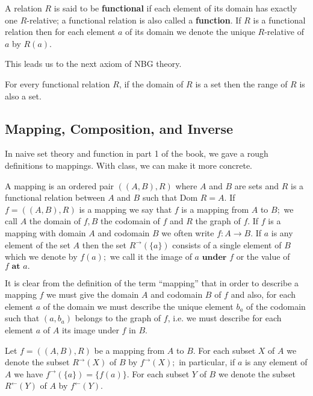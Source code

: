 \begin{definition}
    A relation $R$ is said to be \textbf{functional} if each element of its domain has exactly one $R$-relative; 
    a functional relation is also called a \textbf{function}. If $R$ is a functional relation then for each element 
    $a$ of its domain we denote the unique $R$-relative of $a$ by $R(a).$ 
\end{definition}

    This leads us to the next axiom of NBG theory.
    \begin{axiom}
        For every functional relation $R$, if the domain of $R$ is a set then the range 
        of $R$ is also a set.
    \end{axiom}
\subsection{Mapping, Composition, and Inverse}
    In naive set theory and function in part 1 of the book, we gave a rough 
    definitions to mappings. With class, we can make it more concrete.
    \begin{definition}[mapping]
        A mapping is an ordered pair $((A,B),R)$ where $A$ and $B$ are sets and $R$ is a 
        functional relation between $A$ and $B$ such that Dom $R=A.$ If 
        $f= ( ( A, B) , R) $ is a mapping we say that $f$ is a mapping from 
        $A$ to $B;$ we call $A$ the domain of $f,B$ the codomain of $f$ and $R$ the 
        graph of $f$. If $f$ is a mapping with domain $A$ and codomain $B$ we often write $f:A\to B.$ 
        If $a$ is any element of the set $A$ then the set $R^{\to}(\{a\})$ consists of a single element of 
        $B$ which we denote by $f(a);$ we call it the image of $a\textbf{ under }f$ or the value of $f\textbf{ at }a.$
    \end{definition} 
    It is clear from the definition of the term “mapping” that in order to describe a mapping $f$ we must give the domain $A$ and codomain $B$ of $f$ and also, for each element $a$ of the domain we must describe the unique element $b_a$ of the codomain such that $(a,b_a)$ belongs to the graph of $f$, i.e. we must describe for each element $a$ of $A$ its image under $f$ in $B.$
    
    Let $f= ( ( A, B) , R) $ be a mapping from $A$ to $B$. For each subset $X$ of $A$ we denote the subset 
    $R^{\to}(X)$ of $B$ by $f^{\to}(X);$ in particular, if $a$ is any element of $A$ we have
    $f^{\to}(\{a\})=\{f(a)\}.$ For each subset $Y$ of $B$ we denote the subset $R^{\leftarrow }( Y) $ 
    of $A$ by $f^{\leftarrow }( Y) .$

